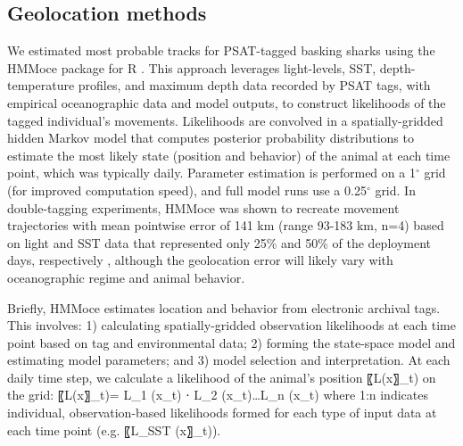 \subsection{Geolocation methods}
We estimated most probable tracks for PSAT-tagged basking sharks using the HMMoce package \citep{Braun2018a} for R \citep{RDevelopmentCoreTeam2015}. This approach leverages light-levels, SST, depth-temperature profiles, and maximum depth data recorded by PSAT tags, with empirical oceanographic data and model outputs, to construct likelihoods of the tagged individual’s movements. Likelihoods are convolved in a spatially-gridded hidden Markov model that computes posterior probability distributions to estimate the most likely state (position and behavior) of the animal at each time point, which was typically daily. Parameter estimation is performed on a 1$^{\circ}$ grid (for improved computation speed), and full model runs use a 0.25$^{\circ}$ grid. In double-tagging experiments, HMMoce was shown to recreate movement trajectories with mean pointwise error of 141 km (range 93-183 km, n=4) based on light and SST data that represented only 25\% and 50\% of the deployment days, respectively \citep{Braun2018a}, although the geolocation error will likely vary with oceanographic regime and animal behavior.

Briefly, HMMoce estimates location and behavior from electronic archival tags. This involves: 1) calculating spatially-gridded observation likelihoods at each time point based on tag and environmental data; 2) forming the state-space model and estimating model parameters; and 3) model selection and interpretation. At each daily time step, we calculate a likelihood of the animal’s position 〖L(x〗_t) on the grid:
〖L(x〗_t)= L_1 (x_t) ⋅ L_2 (x_t)…L_n (x_t)
where 1:n indicates individual, observation-based likelihoods formed for each type of input data at each time point (e.g. 〖L_SST (x〗_t)).

